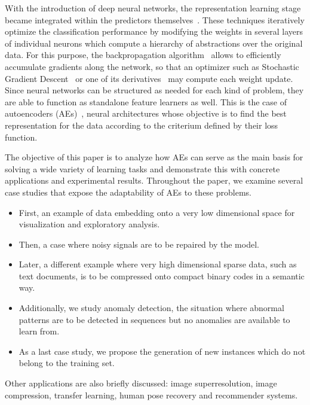 With the introduction of deep neural networks, the representation learning stage became integrated within the predictors themselves~. These techniques iteratively optimize the classification performance by modifying the weights in several layers of individual neurons which compute a hierarchy of abstractions over the original data. For this purpose, the backpropagation algorithm~ allows to efficiently accumulate gradients along the network, so that an optimizer such as Stochastic Gradient Descent~ or one of its derivatives~ may compute each weight update. Since neural networks can be structured as needed for each kind of problem, they are able to function as standalone feature learners as well. This is the case of autoencoders (AEs)~, neural architectures whose objective is to find the best representation for the data according to the criterium defined by their loss function.

The objective of this paper is to analyze how AEs can serve as the main basis for solving a wide variety of learning tasks and demonstrate this with concrete applications and experimental results. 
Throughout the paper, we examine several case studies that expose the adaptability of AEs to these problems.\begin{itemize}
    \item First, an example of data embedding onto a very low dimensional space for visualization and exploratory analysis. 
    \item Then, a case where noisy signals are to be repaired by the model.
    \item Later, a different example where very high dimensional sparse data, such as text documents, is to be compressed onto compact binary codes in a semantic way.
    \item Additionally, we study anomaly detection, the situation where abnormal patterns are to be detected in sequences but no anomalies are available to learn from.
    \item As a last case study, we propose the generation of new instances which do not belong to the training set. 
\end{itemize}    

Other applications are also briefly discussed: image superresolution, image compression, transfer learning, human pose recovery and recommender systems. 

